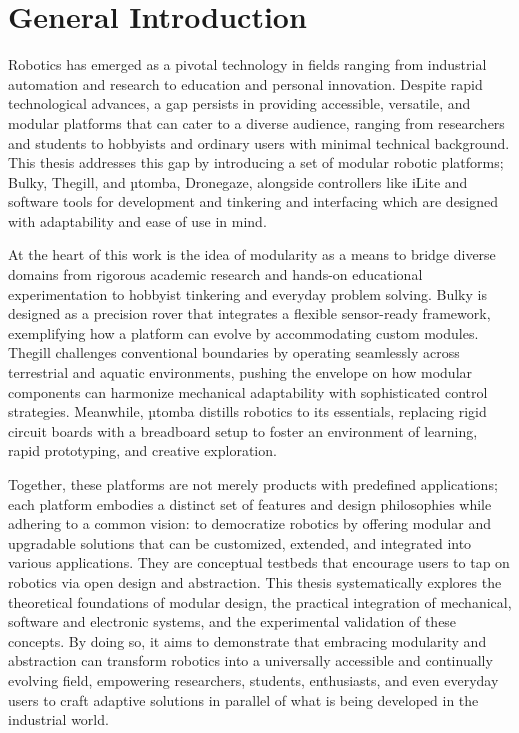 \chapter*{General Introduction}
Robotics has emerged as a pivotal technology in fields ranging from industrial automation and research to education and personal innovation. Despite rapid technological advances, a gap persists in providing accessible, versatile, and modular platforms that can cater to a diverse audience, ranging from researchers and students to hobbyists and ordinary users with minimal technical background. This thesis addresses this gap by introducing a set of modular robotic platforms; Bulky, Thegill, and µtomba, Dronegaze, alongside controllers like iLite and software tools for development and tinkering and interfacing which are designed with adaptability and ease of use in mind.

At the heart of this work is the idea of modularity as a means to bridge diverse domains from rigorous academic research and hands-on educational experimentation to hobbyist tinkering and everyday problem solving. Bulky is designed as a precision rover that integrates a flexible sensor-ready framework, exemplifying how a platform can evolve by accommodating custom modules. Thegill challenges conventional boundaries by operating seamlessly across terrestrial and aquatic environments, pushing the envelope on how modular components can harmonize mechanical adaptability with sophisticated control strategies. Meanwhile, µtomba distills robotics to its essentials, replacing rigid circuit boards with a breadboard setup to foster an environment of learning, rapid prototyping, and creative exploration.

Together, these platforms are not merely products with predefined applications; each platform embodies a distinct set of features and design philosophies while adhering to a common vision: to democratize robotics by offering modular and upgradable solutions that can be customized, extended, and integrated into various applications. They are conceptual testbeds that encourage users to tap on robotics via open design and abstraction. This thesis systematically explores the theoretical foundations of modular design, the practical integration of mechanical, software and electronic systems, and the experimental validation of these concepts. By doing so, it aims to demonstrate that embracing modularity and abstraction can transform robotics into a universally accessible and continually evolving field, empowering researchers, students, enthusiasts, and even everyday users to craft adaptive solutions in parallel of what is being developed in the industrial world.

